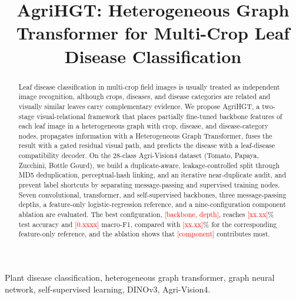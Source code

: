 \documentclass[conference]{IEEEtran}
\newcommand{\TBD}[1]{\textcolor{red}{[#1]}}
\begin{document}
\title{AgriHGT: Heterogeneous Graph Transformer for Multi-Crop Leaf Disease Classification}

\author{
}

\maketitle

\begin{abstract}
Leaf disease classification in multi-crop field images is usually treated as independent image recognition, although crops, diseases, and disease categories are related and visually similar leaves carry complementary evidence. We propose AgriHGT, a two-stage visual-relational framework that places partially fine-tuned backbone features of each leaf image in a heterogeneous graph with crop, disease, and disease-category nodes, propagates information with a Heterogeneous Graph Transformer, fuses the result with a gated residual visual path, and predicts the disease with a leaf-disease compatibility decoder. On the 28-class Agri-Vision4 dataset (Tomato, Papaya, Zucchini, Bottle Gourd), we build a duplicate-aware, leakage-controlled split through MD5 deduplication, perceptual-hash linking, and an iterative near-duplicate audit, and prevent label shortcuts by separating message-passing and supervised training nodes. Seven convolutional, transformer, and self-supervised backbones, three message-passing depths, a feature-only logistic-regression reference, and a nine-configuration component ablation are evaluated. The best configuration, \TBD{backbone, depth}, reaches \TBD{xx.xx}\% test accuracy and \TBD{0.xxxx} macro-F1, compared with \TBD{xx.xx}\% for the corresponding feature-only reference, and the ablation shows that \TBD{component} contributes most.
\end{abstract}

\begin{IEEEkeywords}
Plant disease classification, heterogeneous graph transformer, graph neural network, self-supervised learning, DINOv3, Agri-Vision4.
\end{IEEEkeywords}
\end{document}
